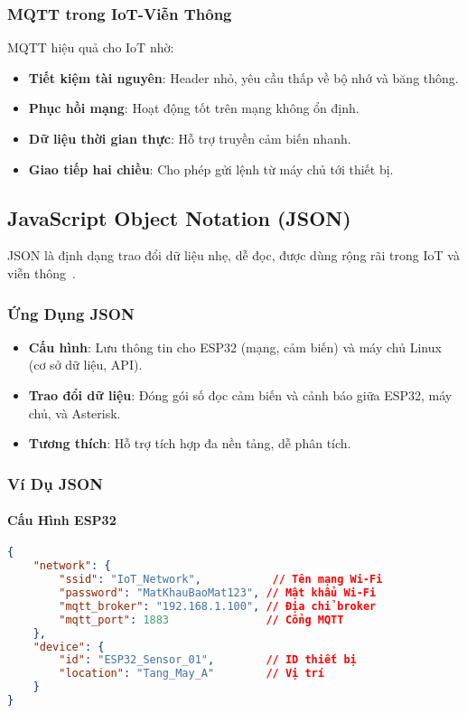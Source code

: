 \subsubsection{MQTT trong IoT-Viễn Thông}
\label{subsubsec:mqtt_iot_integration}

MQTT hiệu quả cho IoT nhờ:

\begin{itemize}
    \item \textbf{Tiết kiệm tài nguyên}: Header nhỏ, yêu cầu thấp về bộ nhớ và băng thông.
    \item \textbf{Phục hồi mạng}: Hoạt động tốt trên mạng không ổn định.
    \item \textbf{Dữ liệu thời gian thực}: Hỗ trợ truyền cảm biến nhanh.
    \item \textbf{Giao tiếp hai chiều}: Cho phép gửi lệnh từ máy chủ tới thiết bị.
\end{itemize}

\subsection{JavaScript Object Notation (JSON)}
\label{subsec:json_format}

JSON là định dạng trao đổi dữ liệu nhẹ, dễ đọc, được dùng rộng rãi trong IoT và viễn thông~\cite{json_rfc7159}.

\subsubsection{Ứng Dụng JSON}
\label{subsubsec:json_applications}

\begin{itemize}
    \item \textbf{Cấu hình}: Lưu thông tin cho ESP32 (mạng, cảm biến) và máy chủ Linux (cơ sở dữ liệu, API).
    \item \textbf{Trao đổi dữ liệu}: Đóng gói số đọc cảm biến và cảnh báo giữa ESP32, máy chủ, và Asterisk.
    \item \textbf{Tương thích}: Hỗ trợ tích hợp đa nền tảng, dễ phân tích.
\end{itemize}

\subsubsection{Ví Dụ JSON}
\label{subsubsec:json_examples}

\paragraph{Cấu Hình ESP32}
\begin{lstlisting}[language=json, caption=Cấu hình ESP32, label=lst:esp32_config]
{
    "network": {
        "ssid": "IoT_Network",           // Tên mạng Wi-Fi
        "password": "MatKhauBaoMat123", // Mật khẩu Wi-Fi
        "mqtt_broker": "192.168.1.100", // Địa chỉ broker
        "mqtt_port": 1883               // Cổng MQTT
    },
    "device": {
        "id": "ESP32_Sensor_01",        // ID thiết bị
        "location": "Tang_May_A"        // Vị trí
    }
}
\end{lstlisting}

